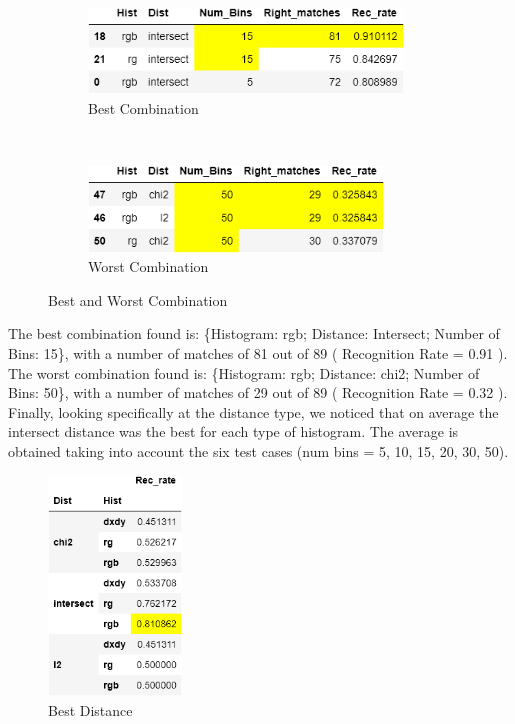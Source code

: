 \documentclass[
	12pt, %
]{fphw}
\begin{document}
\begin{figure}[h!]
    \centering
    \begin{subfigure}[t]{0.5\textwidth}
        \centering
        \includegraphics[height=0.9in]{img/best_combination.png}
         \caption{Best Combination}
    \end{subfigure}%
    ~ 
    \begin{subfigure}[t]{0.5\textwidth}
        \centering
        \includegraphics[height=0.9in]{img/worst_combination.png}
         \caption{Worst Combination}
	\end{subfigure}
	\caption{Best and Worst Combination}
\end{figure}


The best combination found is: \{Histogram: rgb; Distance: Intersect; Number of Bins: 15\}, with a number of matches of 81 out of 89 ( Recognition Rate = 0.91 ).\\ 

The worst combination found is: \{Histogram: rgb; Distance: chi2; Number of Bins: 50\}, with a number of matches of 29 out of 89 ( Recognition Rate = 0.32 ).\\

Finally, looking specifically at the distance type, we noticed that on average the intersect distance was the best for each type of histogram.
The average is obtained taking into account the six test cases (num bins = 5, 10, 15, 20, 30, 50).

\begin{figure}[h!]
    \centering
    \includegraphics[height=2.3in]{img/best_dist.png}
     \caption{Best Distance}
\end{figure}
\end{document}
